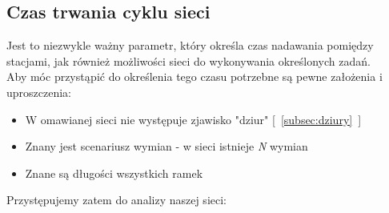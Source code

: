 \documentclass[a4paper,twoside]{article}
\begin{document}
	\subsection{Czas trwania cyklu sieci}
	Jest to niezwykle ważny parametr, który określa czas nadawania pomiędzy stacjami, jak również możliwości sieci do wykonywania określonych zadań.\\
	Aby móc przystąpić do określenia tego czasu potrzebne są pewne założenia i uproszczenia:
	\begin{itemize}
		\item W omawianej sieci nie występuje zjawisko "dziur" [~\ref{subsec:dziury}~]
		\item Znany jest scenariusz wymian - w sieci istnieje \emph{N} wymian
		\item Znane są długości wszystkich ramek
	\end{itemize}
	Przystępujemy zatem do analizy naszej sieci:
\end{document}
